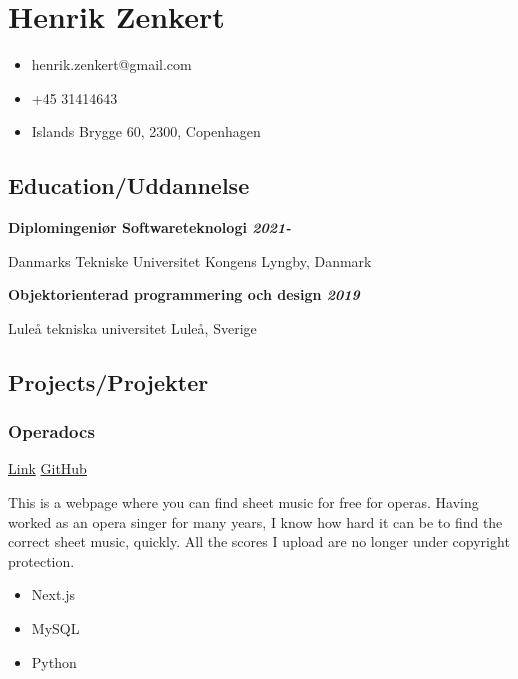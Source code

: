 \documentclass[
]{article}
\author{}
\date{}
\providecommand{\tightlist}{%
  \setlength{\itemsep}{0pt}\setlength{\parskip}{0pt}}
\begin{document}
\hypertarget{henrik-zenkert}{%
\section{Henrik Zenkert}\label{henrik-zenkert}}

\begin{itemize}
\tightlist
\item
  henrik.zenkert@gmail.com
\item
  +45 31414643
\item
  Islands Brygge 60, 2300, Copenhagen
\end{itemize}

\hypertarget{educationuddannelse}{%
\subsection{Education/Uddannelse}\label{educationuddannelse}}

\textbf{Diplomingeniør Softwareteknologi \textbar{} \emph{2021-}}

Danmarks Tekniske Universitet \textbar{} Kongens Lyngby, Danmark

\textbf{Objektorienterad programmering och design \textbar{}
\emph{2019}}

Luleå tekniska universitet \textbar{} Luleå, Sverige

\hypertarget{projectsprojekter}{%
\subsection{Projects/Projekter}\label{projectsprojekter}}

\hypertarget{operadocs}{%
\subsubsection{Operadocs}\label{operadocs}}

\href{https://operadocs.com/}{Link} \textbar{}
\href{https://github.com/YesSeri/opera-docs}{GitHub}

This is a webpage where you can find sheet music for free for operas.
Having worked as an opera singer for many years, I know how hard it can
be to find the correct sheet music, quickly. All the scores I upload are
no longer under copyright protection.

\begin{itemize}
\tightlist
\item
  Next.js
\item
  MySQL
\item
  Python
\end{itemize}
\end{document}

